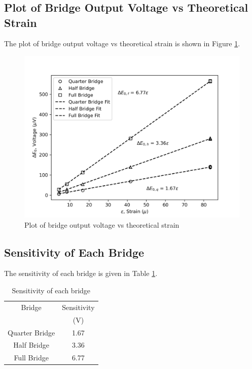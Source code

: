 \section{}


\subsection{Plot of Bridge Output Voltage vs Theoretical Strain}
The plot of bridge output voltage vs theoretical strain is shown in Figure \ref{fig:Q3Plot}.
\begin{figure}[h]
    \centering
    \includegraphics[width=0.8\linewidth]{matplotlib/Q3.png}
    \caption{Plot of bridge output voltage vs theoretical strain}
    \label{fig:Q3Plot}
\end{figure}

\subsection{Sensitivity of Each Bridge}
The sensitivity of each bridge is given in Table \ref{tab:Q3Sensitivity}.

\begin{table}[h]
    \centering
    \caption{Sensitivity of each bridge}
    \label{tab:Q3Sensitivity}
    \begin{tabular}{cc}
        \toprule
        Bridge & Sensitivity \\
        & (V) \\
        \midrule
        Quarter Bridge & 1.67 \\
        Half Bridge & 3.36 \\
        Full Bridge & 6.77 \\
        \bottomrule
    \end{tabular}
\end{table}
\FloatBarrier
